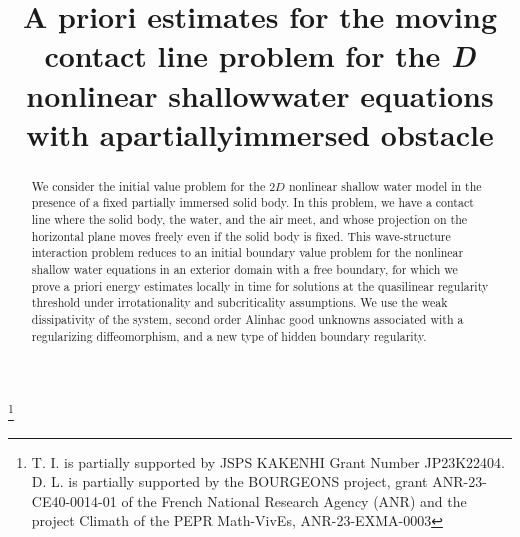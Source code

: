 \documentclass[JEP,XML,SOM,Unicode,NoFloatCountersInSection,published]{cedram}
\theoremstyle{definition}
\begin{document}
\title[The contact line problem for the $2D$ NSW equations]
{A priori estimates for the moving contact line problem for the {\textit{D}} nonlinear shallow\nobreakspace water equations with a\nobreakspace partially\nobreakspace immersed obstacle}

\author[\initial{T.} \lastname{Iguchi}]{ }
\address{Department of Mathematics, Faculty of Science and Technology, Keio University,\\
3-14-1 Hiyoshi, Kohoku-ku, Yokohama 223-8522, Japan}

\author[\initial{D.} \lastname{Lannes}]{ }
\address{Institut de Mathématiques de Bordeaux, Université de Bordeaux et CNRS UMR 5251,\\
351 Cours de la Libération, 33405 Talence Cedex, France}

\thanks{T. I. is partially supported by JSPS KAKENHI Grant Number JP23K22404.
D. L. is partially supported by the BOURGEONS project, grant ANR-23-CE40-0014-01 of the French National Research Agency (ANR) and
the project Climath of the PEPR Math-VivEs, ANR-23-EXMA-0003}


\begin{abstract}
We consider the initial value problem for the $2D$ nonlinear shallow water model in the presence of a fixed partially immersed solid body. In this problem, we have a contact line where the solid body, the water, and the air meet, and whose projection on the horizontal plane moves freely even if the solid body is fixed. This wave-structure interaction problem reduces to an initial boundary value problem for the nonlinear shallow water equations in an exterior domain with a free boundary, for which we prove a priori energy estimates locally in time for solutions at the quasilinear regularity threshold under irrotationality and subcriticality assumptions. We use the weak dissipativity of the system, second order Alinhac good unknowns associated with a regularizing diﬀeomorphism, and a new type of hidden boundary regularity.
\end{abstract}

\end{document}
